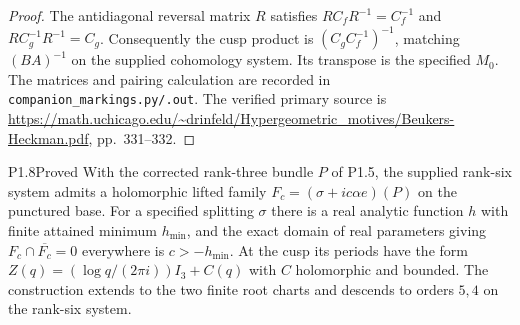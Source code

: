 \begin{proof}
The antidiagonal reversal matrix $R$ satisfies
$RC_fR^{-1}=C_f^{-1}$ and $RC_g^{-1}R^{-1}=C_g$.
Consequently the cusp product is $(C_gC_f^{-1})^{-1}$, matching
$(BA)^{-1}$ on the supplied cohomology system.  Its transpose is the
specified $M_0$.  The matrices and pairing calculation are recorded in
\texttt{companion\_markings.py/.out}.  The verified primary source is
\url{https://math.uchicago.edu/~drinfeld/Hypergeometric_motives/Beukers-Heckman.pdf},
pp.~331--332.
\end{proof}

\begin{statement}{P1.8}{Proved}
With the corrected rank-three bundle $P$ of P1.5, the supplied rank-six
system admits a holomorphic lifted family
$F_c=(\sigma+ic\alpha e)(P)$ on the punctured base.
For a specified splitting $\sigma$ there is a real analytic function
$h$ with finite attained minimum $h_{\min}$, and the exact domain of
real parameters giving $F_c\cap\overline{F_c}=0$ everywhere is
$c>-h_{\min}$.
At the cusp its periods have the form
$Z(q)=(\log q/(2\pi i))I_3+C(q)$ with $C$ holomorphic and bounded.
The construction extends to the two finite root charts and descends to
orders $5,4$ on the rank-six system.
\end{statement}
